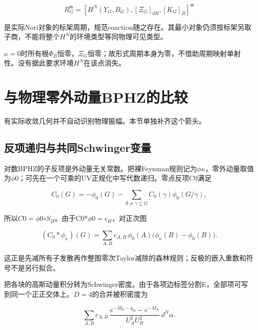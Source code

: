\documentclass[11pt,a4paper,oneside]{ctexrep}
\theoremstyle{cnplain}
\theoremstyle{definition}
\theoremstyle{remark}
\begin{document}
\begin{equation}
R_G^{\mathfrak m}
  =[H^N(Y_G,B_G),[\Xi_G]_{dR},[K_G]_B]^{\mathfrak m}           \label{eq:zero:19}
\end{equation}

是实际Nori对象的标架周期，规范coaction随之存在。其最小对象仍须按标架另取子商，不能将整个\(H^N\)的环境类型等同物理可见类型。

\(\kappa =0\)时所有根\(\Phi _B\)恒零，\(\Xi _G\)恒零；故形式周期本身为零，不借助周期映射单射性。没有据此要求环境\(H^N\)在该点消失。

\section{与物理零外动量BPHZ的比较}\label{sec:zero:8}

有实际收敛几何并不自动识别物理振幅。本节单独补齐这个箭头。

\subsection{反项递归与共同Schwinger变量}\label{sec:zero:8.1}

对数BPHZ的子反项是外动量无关常数。把裸Feynman规则记为\(\phi \kappa \)，零外动量取值为\(\phi 0\)；可先在一个可乘的UV正规化中写代数递归。零点反项C0满足

\begin{equation}
C_0(G)=-\phi_0(G)-\sum_{\emptyset\ne\gamma\subsetneq G}
                                C_0(\gamma)\phi_0(G/\gamma),
\end{equation}

所以\(C0=\phi 0\)\ensuremath{\circ}\(S_H\)。由于C0*\(\phi 0=\epsilon _H\)，对正次图

\begin{equation}
(C_0*\phi_\kappa)(G)
   =\sum_{A,B}c_{A,B}\,
                  \phi_0(A)\bigl(\phi_\kappa(B)-\phi_0(B)\bigr).       \label{eq:zero:20}
\end{equation}

这正是先减所有子发散再作整图零次Taylor减除的森林规则；反极的嵌入重数和符号不是另行拟合。

把各块的高斯动量积分转为Schwinger密度。由于各项边标签分割E，全部项可写到同一个正正交体上。\(D=4\)的合并被积密度为

\begin{equation}
\sum_{A,B}c_{A,B}\,
 \frac{e^{-M_E-q_B}-e^{-M_E}}{U_A^2U_B^2}\,d^N\alpha.          \label{eq:zero:21}
\end{equation}
\end{document}
